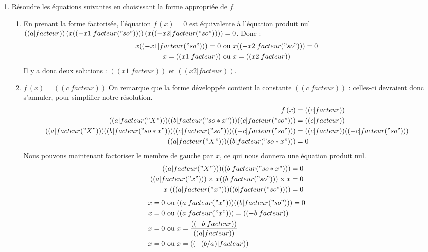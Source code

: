 \begin{enumerate}
\begin{enumerate}
\end{enumerate}
\item Résoudre les équations suivantes en choisissant la forme appropriée de $f$.
\begin{enumerate}
\item En prenant la forme factorisée, l'équation $f\,(x)=0$ est équivalente à l'équation produit nul $(( a|facteur ))\,(x (( -x1|facteur("so") )) )\,(x (( -x2|facteur("so") )) ) = 0$. Donc :
\begin{align*}
x (( -x1|facteur("so") ))=0 &\text{ ou } x (( -x2|facteur("so") ))=0 \\
x=(( x1|facteur )) &\text{ ou } x=(( x2|facteur ))
\end{align*}
Il y a donc deux solutions : $(( x1|facteur ))$ et $(( x2|facteur ))$.
\item $f\,(x)=(( c|facteur ))$ On remarque que la forme développée contient la constante $(( c|facteur ))$ : celles-ci devraient donc s'annuler, pour simplifier notre résolution.
\begin{align*}
f\,(x) &= (( c|facteur )) \\
(( a|facteur("X") )) (( b|facteur("so*x") )) (( c|facteur("so") )) &= (( c|facteur )) \\
(( a|facteur("X") )) (( b|facteur("so*x") )) (( c|facteur("so") )) (( -c|facteur("so") )) &= (( c|facteur )) (( -c|facteur("so") )) \\
(( a|facteur("X") )) (( b|facteur("so*x") )) &= 0 \\
\end{align*}
Nous pouvons maintenant factoriser le membre de gauche par $x$, ce qui nous donnera une équation produit nul.
\begin{align*}
(( a|facteur("X") )) (( b|facteur("so*x") )) &= 0 \\
(( a|facteur("x") ))\times x (( b|facteur("so") ))\times x &= 0 \\
x\,\left( (( a|facteur("x") )) (( b|facteur("so") )) \right) &= 0 \\
\end{align*}
\begin{align*}
x =0 &\text{ ou } (( a|facteur("x") )) (( b|facteur("so") ))=0 \\
x =0 &\text{ ou } (( a|facteur("x") )) =(( -b|facteur )) \\
x =0 &\text{ ou } x = \frac{(( -b|facteur ))}{(( a|facteur ))} \\
x =0 &\text{ ou } x = (( -(b/a)|facteur )) \\
\end{align*}

\end{enumerate}
\end{enumerate}
